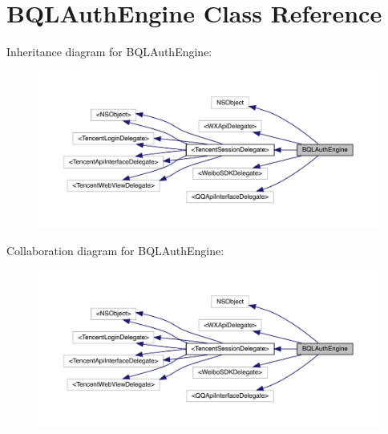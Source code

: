 \hypertarget{interface_b_q_l_auth_engine}{}\section{B\+Q\+L\+Auth\+Engine Class Reference}
\label{interface_b_q_l_auth_engine}


Inheritance diagram for B\+Q\+L\+Auth\+Engine\+:\nopagebreak
\begin{figure}[H]
\begin{center}
\leavevmode
\includegraphics[width=350pt]{interface_b_q_l_auth_engine__inherit__graph}
\end{center}
\end{figure}


Collaboration diagram for B\+Q\+L\+Auth\+Engine\+:\nopagebreak
\begin{figure}[H]
\begin{center}
\leavevmode
\includegraphics[width=350pt]{interface_b_q_l_auth_engine__coll__graph}
\end{center}
\end{figure}

